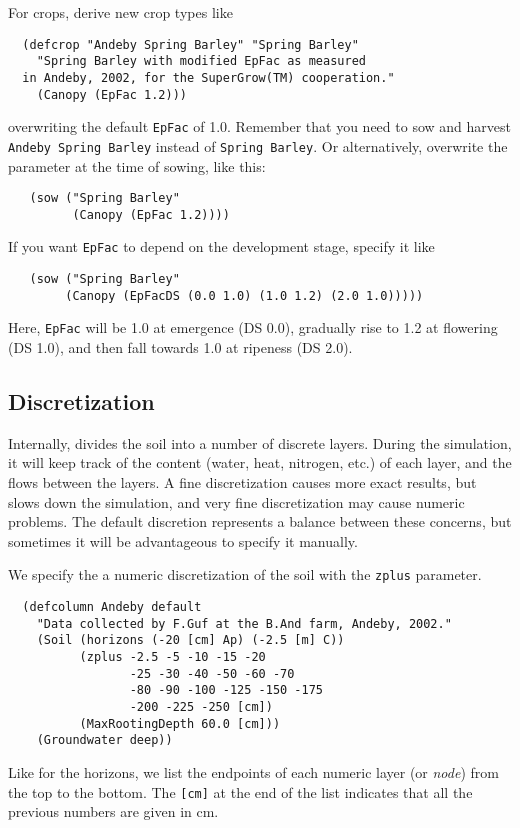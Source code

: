 \documentclass[a4paper,11pt]{article}
\begin{document}
For crops, derive new crop types like
\begin{verbatim}
  (defcrop "Andeby Spring Barley" "Spring Barley"
    "Spring Barley with modified EpFac as measured
  in Andeby, 2002, for the SuperGrow(TM) cooperation."
    (Canopy (EpFac 1.2)))
\end{verbatim}
overwriting the default \texttt{EpFac} of 1.0.  Remember that you need
to sow and harvest \texttt{Andeby Spring Barley} instead of
\texttt{Spring Barley}.  Or alternatively, overwrite the parameter at
the time of sowing, like this:
\begin{verbatim}
   (sow ("Spring Barley"
         (Canopy (EpFac 1.2))))
\end{verbatim}
If you want \texttt{EpFac} to depend on the development stage, specify
it like
\begin{verbatim}
   (sow ("Spring Barley"
        (Canopy (EpFacDS (0.0 1.0) (1.0 1.2) (2.0 1.0)))))
\end{verbatim}
Here, \texttt{EpFac} will be 1.0 at emergence (DS 0.0), gradually rise
to 1.2 at flowering (DS 1.0), and then fall towards 1.0 at ripeness (DS
2.0).

\subsection{Discretization}

Internally, \daisy{} divides the soil into a number of discrete layers.
During the simulation, it will keep track of the content (water, heat,
nitrogen, etc.) of each layer, and the flows between the layers. A
fine discretization causes more exact results, but slows down the
simulation, and very fine discretization may cause numeric problems.
The default discretion represents a balance between these concerns,
but sometimes it will be advantageous to specify it manually.

We specify the a numeric discretization of the soil with the
\texttt{zplus} parameter.  
\begin{verbatim}
  (defcolumn Andeby default
    "Data collected by F.Guf at the B.And farm, Andeby, 2002."
    (Soil (horizons (-20 [cm] Ap) (-2.5 [m] C))
          (zplus -2.5 -5 -10 -15 -20
                 -25 -30 -40 -50 -60 -70
                 -80 -90 -100 -125 -150 -175
                 -200 -225 -250 [cm])
          (MaxRootingDepth 60.0 [cm]))
    (Groundwater deep))
\end{verbatim}
Like for the horizons, we list the endpoints of each numeric layer (or
\emph{node}) from the top to the bottom.  The \verb|[cm]| at the end
of the list indicates that all the previous numbers are given in cm.
\end{document}
